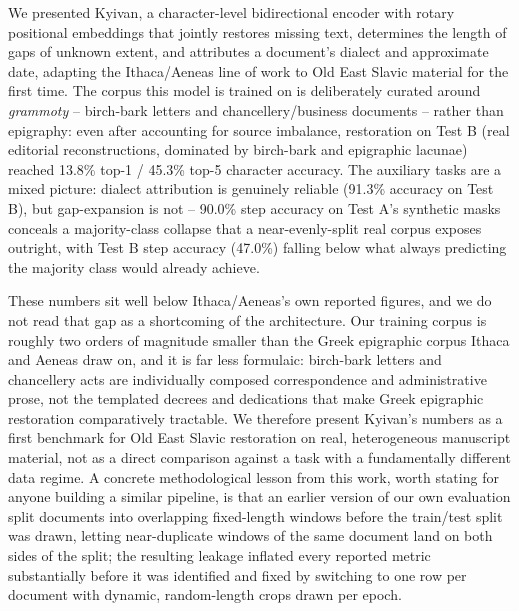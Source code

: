 \documentclass{article}
\begin{document}
We presented Kyivan, a character-level bidirectional encoder with rotary positional embeddings that jointly restores missing text, determines the length of gaps of unknown extent, and attributes a document's dialect and approximate date, adapting the Ithaca/Aeneas line of work \cite{assael2022,assael2025} to Old East Slavic material for the first time. The corpus this model is trained on is deliberately curated around \emph{grammoty} -- birch-bark letters and chancellery/business documents -- rather than epigraphy: even after accounting for source imbalance, restoration on Test B (real editorial reconstructions, dominated by birch-bark and epigraphic lacunae) reached 13.8\% top-1 / 45.3\% top-5 character accuracy. The auxiliary tasks are a mixed picture: dialect attribution is genuinely reliable (91.3\% accuracy on Test B), but gap-expansion is not -- 90.0\% step accuracy on Test A's synthetic masks conceals a majority-class collapse that a near-evenly-split real corpus exposes outright, with Test B step accuracy (47.0\%) falling below what always predicting the majority class would already achieve.

These numbers sit well below Ithaca/Aeneas's own reported figures, and we do not read that gap as a shortcoming of the architecture. Our training corpus is roughly two orders of magnitude smaller than the Greek epigraphic corpus Ithaca and Aeneas draw on, and it is far less formulaic: birch-bark letters and chancellery acts are individually composed correspondence and administrative prose, not the templated decrees and dedications that make Greek epigraphic restoration comparatively tractable. We therefore present Kyivan's numbers as a first benchmark for Old East Slavic restoration on real, heterogeneous manuscript material, not as a direct comparison against a task with a fundamentally different data regime. A concrete methodological lesson from this work, worth stating for anyone building a similar pipeline, is that an earlier version of our own evaluation split documents into overlapping fixed-length windows before the train/test split was drawn, letting near-duplicate windows of the same document land on both sides of the split; the resulting leakage inflated every reported metric substantially before it was identified and fixed by switching to one row per document with dynamic, random-length crops drawn per epoch.
\end{document}

